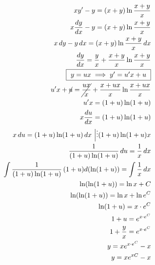 \documentclass[../rgr_2.tex]{subfiles}
\begin{document}
\Solution

\begin{align}
	xy'-y=(x+y)\ln\frac{x+y}{x} \\
	x\frac{dy}{dx}-y=(x+y)\ln\frac{x+y}{x} \\
	x\,dy-y\,dx=(x+y)\ln\frac{x+y}{x}\,dx \\
	\frac{dy}{dx}=\frac{y}{x}+\frac{x+y}{x}\ln\frac{x+y}{x} \\
	\fbox{
		$
			y=ux \implies y'=u'x+u
		$
	} \\
	u'x+\cancel{u}=\cancel{\frac{ux}{x}}+\frac{x+ux}{x}\ln\frac{x+ux}{x} \\
	u'x=(1+u)\ln(1+u) \\
	x\frac{du}{dx}=(1+u)\ln(1+u) \\
	x\,du=(1+u)\ln(1+u)\,dx ~\Big|\vdots (1+u)\ln(1+u)x \\
	\frac{1}{(1+u)\ln(1+u)}\,du=\frac{1}{x}\,dx \\
	\int\frac{1}{(1+u)\ln(1+u)}\,(1+u)d(\ln(1+u))=\int\frac{1}{x}\,dx \\
	\ln(\ln(1+u))=\ln x+C \\
	\ln(\ln(1+u))=\ln x+\ln e^C \\
	\ln(1+u)=x\cdot e^C \\
	1+u=e^{x\cdot e^C} \\
	1+\frac{y}{x}=e^{x\cdot e^C} \\
	y=xe^{x\cdot e^C}-x \\
	y=xe^{xC}-x
\end{align}

\Answer{
	<++>
}
\end{document}
